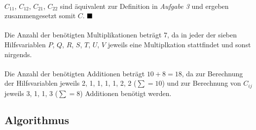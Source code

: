\\
$C_{1 1}$, $C_{1 2}$, $C_{2 1}$, $C_{2 2}$ sind äquivalent zur Definition in \emph{Aufgabe 3} und ergeben zusammengesetzt somit $C$. $\qed$
\\ \\
Die Anzahl der benötigten Multiplikationen beträgt 7, da in jeder der sieben Hilfsvariablen $P$, $Q$, $R$, $S$, $T$, $U$, $V$ jeweils eine Multiplkation stattfindet und sonst nirgends.\\ \\
Die Anzahl der benötigten Additionen beträgt $10 + 8 = 18$, da zur Berechnung der Hilfsvariablen jeweils 2, 1, 1, 1, 1, 2, 2 ($\sum = 10$) und zur Berechnung von $C_{i j}$ jeweils 3, 1, 1, 3 ($\sum = 8$) Additionen benötigt werden.

\subsection{Algorithmus}
\label{sub:Algorithmus}

